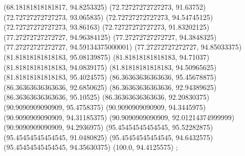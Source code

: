 {{{		(68.18181818181817, 94.8253325)
		(72.72727272727273, 91.63752)
		(72.72727272727273, 93.065835)
		(72.72727272727273, 94.54745125)
		(72.72727272727273, 93.86163)
		(72.72727272727273, 91.83202125)
		(77.27272727272727, 94.96384125)
		(77.27272727272727, 94.3848325)
		(77.27272727272727, 94.59134375000001)
		(77.27272727272727, 94.85033375)
		(81.81818181818183, 95.08139875)
		(81.81818181818183, 94.71037)
		(81.81818181818183, 94.0839175)
		(81.81818181818183, 94.50965625)
		(81.81818181818183, 95.4024575)
		(86.36363636363636, 95.45678875)
		(86.36363636363636, 92.6850625)
		(86.36363636363636, 92.94389625)
		(86.36363636363636, 95.10525)
		(86.36363636363636, 92.20830375)
		(90.9090909090909, 95.4758375)
		(90.9090909090909, 94.3445975)
		(90.9090909090909, 94.31185375)
		(90.9090909090909, 92.01214374999999)
		(90.9090909090909, 94.2936975)
		(95.45454545454545, 95.52282875)
		(95.45454545454545, 91.0480825)
		(95.45454545454545, 94.6432575)
		(95.45454545454545, 94.35630375)
		(100.0, 94.4125575)
	};

}}
